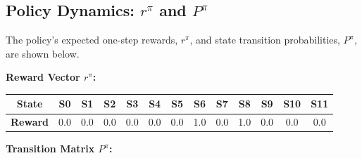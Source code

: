 \documentclass[12pt]{article}
\begin{document}
\subsection{Policy Dynamics: \texorpdfstring{$r^\pi$}{r pi} and \texorpdfstring{$P^\pi$}{P pi}}
The policy's expected one-step rewards, $r^\pi$, and state transition probabilities, $P^\pi$, are shown below.

\noindent\textbf{Reward Vector $r^\pi$:}

\begin{center}
\begin{tabular}{|c|c|c|c|c|c|c|c|c|c|c|c|c|}
\hline
\textbf{State} & S0 & S1 & S2 & S3 & S4 & S5 & S6 & S7 & S8 & S9 & S10 & S11 \\
\hline
\textbf{Reward} & 0.0 & 0.0 & 0.0 & 0.0 & 0.0 & 0.0 & 1.0 & 0.0 & 1.0 & 0.0 & 0.0 & 0.0 \\
\hline
\end{tabular}
\end{center}

\noindent\textbf{Transition Matrix $P^\pi$:}
\end{document}
